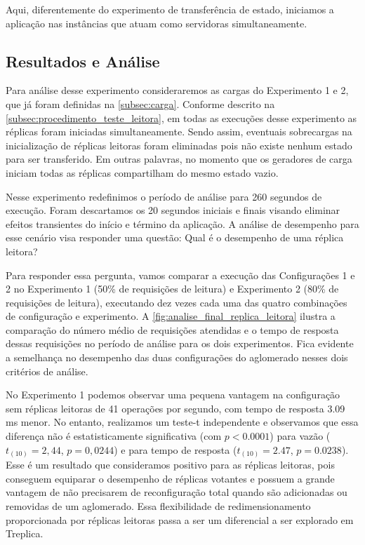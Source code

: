 Aqui, diferentemente do experimento de transferência de estado, iniciamos a aplicação nas
instâncias que atuam como servidoras simultaneamente.

\subsection{Resultados e Análise}

Para análise desse experimento consideraremos as cargas do Experimento 1 e 2, que já foram
definidas na \autoref{subsec:carga}. Conforme descrito na
\autoref{subsec:procedimento_teste_leitora}, em todas as execuções desse experimento as
réplicas foram iniciadas simultaneamente. Sendo assim, eventuais sobrecargas na
inicialização de réplicas leitoras foram eliminadas pois não existe nenhum estado para ser
transferido. Em outras palavras, no momento que os geradores de carga iniciam todas as
réplicas compartilham do mesmo estado vazio.

Nesse experimento redefinimos o período de análise para 260 segundos de execução. Foram
descartamos os 20 segundos iniciais e finais visando eliminar efeitos transientes do
início e término da aplicação. A análise de desempenho para esse cenário visa responder
uma questão: Qual é o desempenho de uma réplica leitora?

Para responder essa pergunta, vamos comparar a execução das Configurações 1 e 2 no
Experimento 1 (50\% de requisições de leitura) e Experimento 2 (80\% de requisições de
leitura), executando dez vezes cada uma das quatro combinações de configuração e
experimento. A \autoref{fig:analise_final_replica_leitora} ilustra a comparação do número
médio de requisições atendidas e o tempo de resposta dessas requisições no período de
análise para os dois experimentos. Fica evidente a semelhança no desempenho das duas
configurações do aglomerado nesses dois critérios de análise.

No Experimento 1 podemos observar uma pequena vantagem na configuração sem réplicas
leitoras de 41 operações por segundo, com tempo de resposta 3.09 ms menor. No entanto,
realizamos um teste-t independente e observamos que essa diferença não é estatisticamente
significativa (com $p < 0.0001$) para vazão ($t_{(10)}=2,44$, $p = 0,0244$) e para tempo de
resposta ($t_{(10)}=2.47$, $p = 0.0238$). Esse é um resultado que consideramos positivo
para as réplicas leitoras, pois conseguem equiparar o desempenho de réplicas votantes e
possuem a grande vantagem de não precisarem de reconfiguração total quando são adicionadas
ou removidas de um aglomerado. Essa flexibilidade de redimensionamento proporcionada por
réplicas leitoras passa a ser um diferencial a ser explorado em Treplica.

